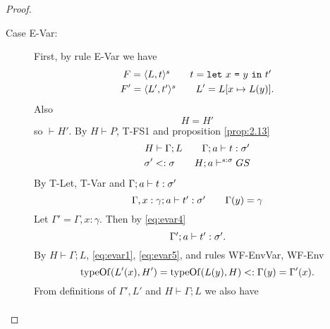 \begin{proof}
\begin{description}
\begin{description}
\begin{description}
            \item[Case {\sc E-Var}:] First, by rule {\sc E-Var} we have
              \begin{equation*} 
                \begin{gathered}
                  F = \mbox{$\langle L, t \rangle^s$} \quad\quad t = \mbox{\mdseries\texttt{let}~$x$~\texttt{=}~$y$~\texttt{in}~$t'$} \\ 
                  F' = \mbox{$\langle L', t' \rangle^s$} \quad\quad L' = L[x \mapsto L(y)].
                \end{gathered}
              \end{equation*}
              Also
              \begin{equation} \label{eq:evar1}
                H = H'
              \end{equation}
              so $\vdash H'$.
              By $H \vdash P$, {\sc T-FS1} and proposition \ref{prop:2.13}
              \begin{equation} \label{eq:evar3}
                \begin{gathered}
                  H \vdash \Gamma; L \quad\quad \mbox{$\Gamma;a\vdash t:\sigma'$} \\
                  \sigma' <: \sigma \quad\quad H; a \vdash^{s: \sigma} GS
                \end{gathered}
              \end{equation}
              By {\sc T-Let, T-Var} and $\mbox{$\Gamma;a\vdash t:\sigma'$}$
              \begin{equation} \label{eq:evar4}
                \mbox{$\Gamma, x: \gamma;a\vdash t':\sigma'$} \quad\quad \Gamma(y) =
                \gamma
              \end{equation}
              Let $\Gamma' = \Gamma, x: \gamma$.
              Then by \eqref{eq:evar4}
              \begin{equation} \label{eq:evar5}
                \mbox{$\Gamma';a\vdash t':\sigma'$}.
              \end{equation}
              By $H \vdash \Gamma; L$, \eqref{eq:evar1}, \eqref{eq:evar5}, and
              rules {\sc WF-EnvVar}, {\sc WF-Env}
              \begin{equation*}
                \mbox{$\mathrm{typeOf}$}(L'(x), H') = \mbox{$\mathrm{typeOf}$}(L(y), H) <: \Gamma(y) =
                \Gamma'(x).
              \end{equation*}
              From definitions of $\Gamma', L'$ and $H \vdash \Gamma;L$ we also have 
              \begin{equation*}
                \begin{aligned}

\end{aligned}
\end{equation*}
\end{description}
\end{description}
\end{description}
\end{proof}
